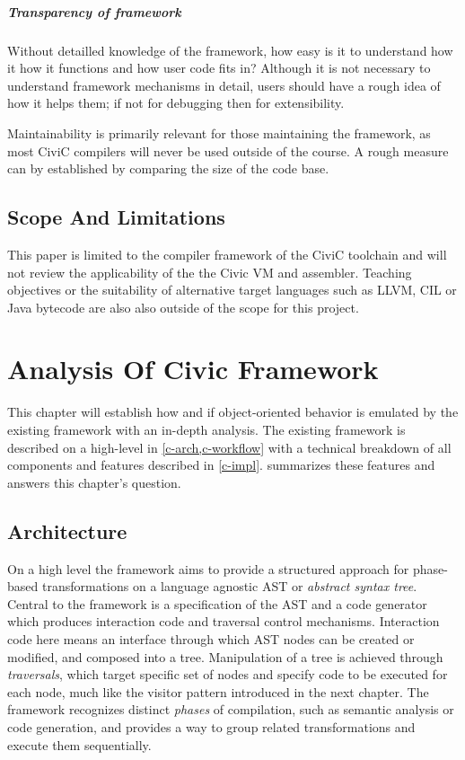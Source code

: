 \documentclass[twoside,openright]{uva-bachelor-thesis}
\begin{document}
		\paragraph{Transparency of framework}
			Without detailled knowledge of the framework, how easy is it to understand how it how it functions and how user code fits in? Although it is not necessary to understand framework mechanisms in detail, users should have a rough idea of how it helps them; if not for debugging then for extensibility.
			
		Maintainability is primarily relevant for those maintaining the framework, as most CiviC compilers will never be used outside of the  course. A rough measure can by established by comparing the size of the code base.
		
	
	\section{Scope And Limitations}
		This paper is limited to the compiler framework of the CiviC toolchain and will not review the applicability of the the Civic VM and assembler. Teaching objectives or the suitability of alternative target languages such as LLVM, CIL or Java bytecode are also also outside of the scope for this project.
			


\chapter{Analysis Of Civic Framework}
\label{analysis}
	This chapter will establish how and if object-oriented behavior is emulated by the existing framework with an in-depth analysis. The existing framework is described on a high-level in \cref{c-arch,c-workflow} with a technical breakdown of all components and features described in \cref{c-impl}.  summarizes these features and answers this chapter's question.
	
	\section{Architecture}
	\label{c-arch}
		On a high level the framework aims to provide a structured approach for phase-based transformations on a language agnostic AST or \emph{abstract syntax tree}. Central to the framework is a specification of the AST and a code generator which produces interaction code and traversal control mechanisms. Interaction code here means an interface through which AST nodes can be created or modified, and composed into a tree. Manipulation of a tree is achieved through \emph{traversals}, which target specific set of nodes and specify code to be executed for each node, much like the visitor pattern introduced in the next chapter. The framework recognizes distinct \emph{phases} of compilation, such as semantic analysis or code generation, and provides a way to group related transformations and execute them sequentially.
				
\end{document}
